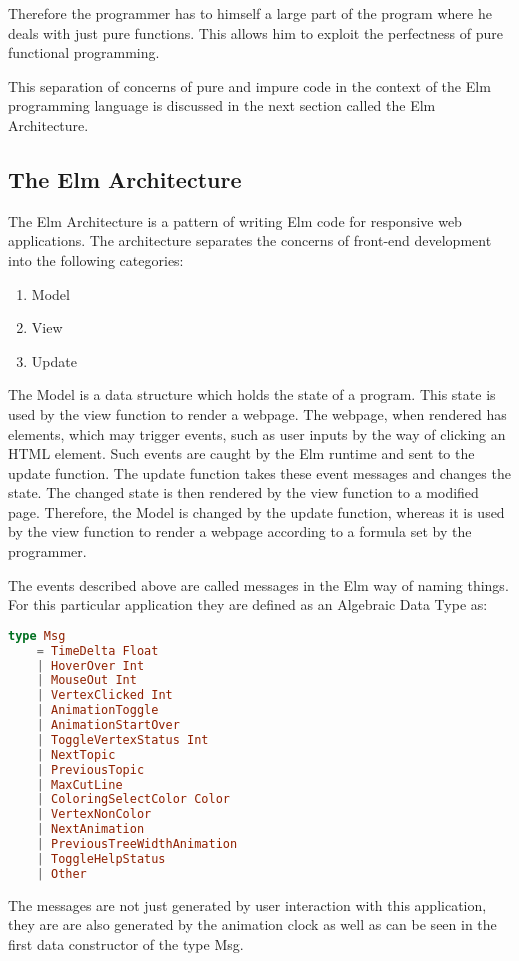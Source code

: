 Therefore the programmer has to himself a large part of the program where he
deals with just pure functions. This allows him to exploit the perfectness of
pure functional programming.

This separation of concerns of pure and impure code in the context of the Elm
programming language is discussed in the next section called the Elm
Architecture.

\subsection{The Elm Architecture}
The Elm Architecture is a pattern of writing Elm code for responsive web applications. 
The architecture separates the concerns of front-end development into the following categories:

\begin{enumerate}
\item Model
\item View
\item Update
\end{enumerate}

The Model is a data structure which holds the state of a program. This state is
used by the view function to render a webpage. The webpage, when rendered has
elements, which may trigger events, such as user inputs by the way of clicking
an HTML element. Such events are caught by the Elm runtime and sent to the update
function.  The update function takes these event messages and changes the
state. The changed state is then rendered by the view function to a modified
page.  Therefore, the Model is changed by the update function, whereas it is
used by the view function to render a webpage according to a formula set by the
programmer.

The events described above are called messages in the Elm way of naming things. For this particular
application they are defined as an Algebraic Data Type as:

\begin{lstlisting}[language=elm]
type Msg
    = TimeDelta Float
    | HoverOver Int
    | MouseOut Int
    | VertexClicked Int
    | AnimationToggle
    | AnimationStartOver
    | ToggleVertexStatus Int
    | NextTopic
    | PreviousTopic
    | MaxCutLine
    | ColoringSelectColor Color
    | VertexNonColor
    | NextAnimation 
    | PreviousTreeWidthAnimation
    | ToggleHelpStatus
    | Other
\end{lstlisting}
The messages are not just generated by user interaction with this application, they are 
are also generated by the animation clock as well as can be seen in the first data constructor of the type Msg.

